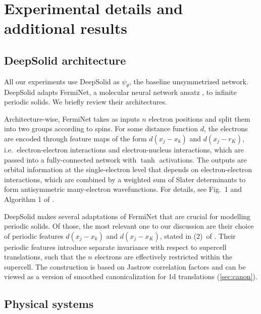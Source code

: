 
\section{Experimental details and additional results}  \label{appendix:experiments}

\subsection{DeepSolid architecture} \label{appendix:DeepSolid}

All our experiments use DeepSolid \cite{li2022ab} as $\psi_\theta$, the baseline unsymmetrized network. DeepSolid adapts FermiNet, a molecular neural network ansatz \citep{pfau2020ab}, to infinite periodic solids. We briefly review their architectures. 

\vspace{.5em}

Architecture-wise, FermiNet takes as inputs $n$ electron positions and split them into two groups according to spins. For some distance function $d$, the electrons are encoded through feature maps of the form $d(x_j-x_k)$ and $d(x_j-r_K)$, i.e.~electron-electron interactions and electron-nucleus interactions, which are passed into a fully-connected network with $\tanh$ activations. The outputs are orbital information at the single-electron level that depends on electron-electron interactions, which are combined by a weighted sum of Slater determinants to form antisymmetric many-electron wavefunctions. For details, see Fig.~1 and Algorithm 1 of \cite{pfau2020ab}.

\vspace{.5em}

DeepSolid makes several adaptations of FermiNet that are crucial for modelling periodic solids. Of those, the most relevant one to our discussion are their choice of periodic features $d(x_j-x_k)$ and $d(x_j-x_K)$, stated in (2)~of \cite{pfau2020ab}. Their periodic features introduce separate invariance with respect to supercell translations, such that the $n$ electrons are effectively restricted within the supercell. The construction is based on Jastrow correlation factors \cite{whitehead2016jastrow} and can be viewed as a version of smoothed canonicalization for 1d translations (\cref{sec:canon}).


\subsection{Physical systems}

